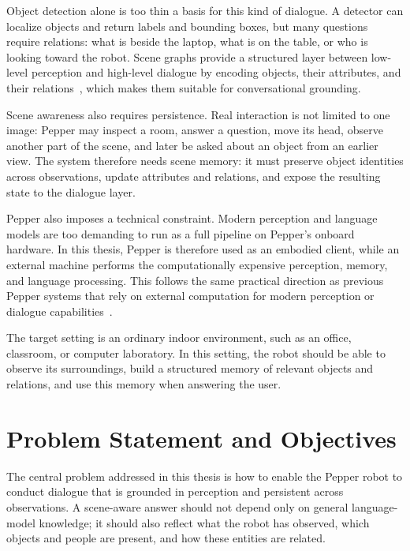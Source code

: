 Object detection alone is too thin a basis for this kind of dialogue. A detector can localize objects and return labels and bounding boxes, but many questions require relations: what is beside the laptop, what is on the table, or who is looking toward the robot. Scene graphs provide a structured layer between low-level perception and high-level dialogue by encoding objects, their attributes, and their relations~\cite{johnson_image_2015}, which makes them suitable for conversational grounding.

Scene awareness also requires persistence. Real interaction is not limited to one image: Pepper may inspect a room, answer a question, move its head, observe another part of the scene, and later be asked about an object from an earlier view. The system therefore needs scene memory: it must preserve object identities across observations, update attributes and relations, and expose the resulting state to the dialogue layer.

Pepper also imposes a technical constraint. Modern perception and language models are too demanding to run as a full pipeline on Pepper's onboard hardware. In this thesis, Pepper is therefore used as an embodied client, while an external machine performs the computationally expensive perception, memory, and language processing. This follows the same practical direction as previous Pepper systems that rely on external computation for modern perception or dialogue capabilities~\cite{reyes_near_2018,trinquet_future_2025,brad_retrieval-augmented_2025,grassi_grounding_2024}.

The target setting is an ordinary indoor environment, such as an office, classroom, or computer laboratory. In this setting, the robot should be able to observe its surroundings, build a structured memory of relevant objects and relations, and use this memory when answering the user.

\section{Problem Statement and Objectives}

The central problem addressed in this thesis is how to enable the Pepper robot to conduct dialogue that is grounded in perception and persistent across observations. A scene-aware answer should not depend only on general language-model knowledge; it should also reflect what the robot has observed, which objects and people are present, and how these entities are related.

